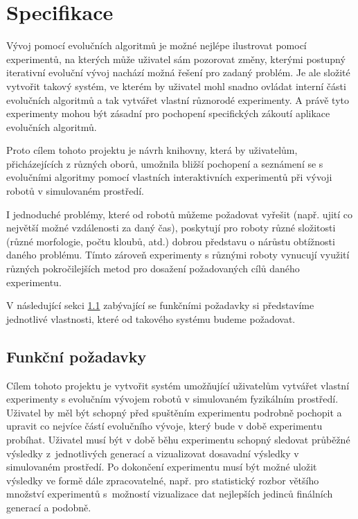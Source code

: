 \chapter{Specifikace} \label{chapter-specifikace}

Vývoj pomocí evolučních algoritmů je možné nejlépe ilustrovat pomocí
experimentů, na kterých může uživatel sám pozorovat změny, kterými postupný
iterativní evoluční vývoj nachází možná řešení pro zadaný problém. Je ale
složité vytvořit takový systém, ve kterém by uživatel mohl snadno ovládat
interní části evolučních algoritmů a tak vytvářet vlastní různorodé
experimenty. A právě tyto experimenty mohou být zásadní pro pochopení
specifických zákoutí aplikace evolučních algoritmů.

Proto cílem tohoto projektu je návrh knihovny, která by uživatelům,
přicházejících z různých oborů, umožnila bližší pochopení a seznámení se s
evolučními algoritmy pomocí vlastních interaktivních experimentů při vývoji
robotů v simulovaném prostředí. 

I jednoduché problémy, které od robotů můžeme požadovat vyřešit (např. ujití co
největší možné vzdálenosti za daný čas), poskytují pro roboty různé složitosti
(různé morfologie, počtu kloubů, atd.) dobrou představu o nárůstu obtížnosti
daného problému. Tímto zároveň experimenty s různými roboty vynucují využití
různých pokročilejších metod pro dosažení požadovaných cílů daného experimentu.

V následující sekci \ref{Specifikace-funkčnípožadavky} zabývající se funkčními
požadavky si představíme jednotlivé vlastnosti, které od takového systému
budeme požadovat.

\section{Funkční požadavky} \label{Specifikace-funkčnípožadavky}

Cílem tohoto projektu je vytvořit systém umožňující uživatelům vytvářet vlastní
experimenty s evolučním vývojem robotů v simulovaném fyzikálním prostředí.
Uživatel by měl být schopný před spuštěním experimentu podrobně pochopit a
upravit co nejvíce částí evolučního vývoje, který bude v době experimentu
probíhat. Uživatel musí být v době běhu experimentu schopný sledovat průběžné
výsledky z~jednotlivých generací a vizualizovat dosavadní výsledky v
simulovaném prostředí. Po dokončení experimentu musí být možné uložit výsledky
ve formě dále zpracovatelné, např. pro statistický rozbor většího množství
experimentů s~možností vizualizace dat nejlepších jedinců finálních generací a
podobně.

